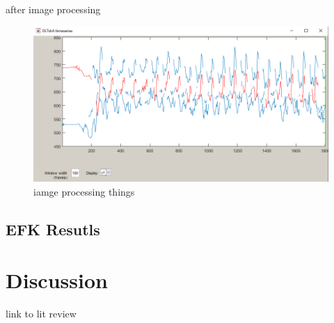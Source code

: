 after image processing

\begin{figure}[!ht] 
\captionsetup{width=\linewidth, font=small}  
\includegraphics[width=\linewidth]{figures/ipdatapattern.png}
\caption{iamge processing things}
\label{fig:ipdatapattern}
\end{figure}



\subsection{EFK Resutls}


\section{Discussion}

link to lit review









